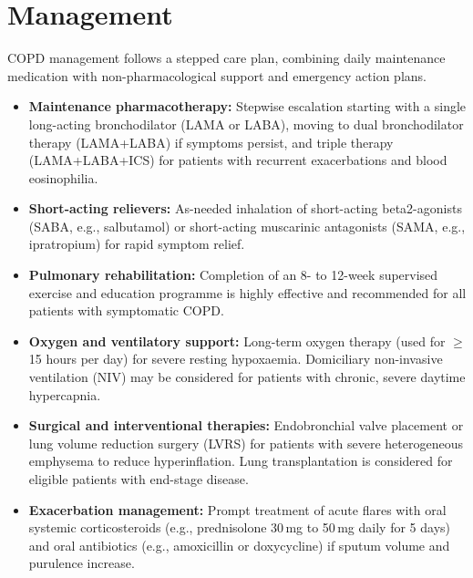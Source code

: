 \section*{Management}
COPD management follows a stepped care plan, combining daily maintenance medication with non-pharmacological support and emergency action plans.
\begin{itemize}
    \item \textbf{Maintenance pharmacotherapy:} Stepwise escalation starting with a single long-acting bronchodilator (LAMA or LABA), moving to dual bronchodilator therapy (LAMA+LABA) if symptoms persist, and triple therapy (LAMA+LABA+ICS) for patients with recurrent exacerbations and blood eosinophilia.
    \item \textbf{Short-acting relievers:} As-needed inhalation of short-acting beta2-agonists (SABA, e.g., salbutamol) or short-acting muscarinic antagonists (SAMA, e.g., ipratropium) for rapid symptom relief.
    \item \textbf{Pulmonary rehabilitation:} Completion of an 8- to 12-week supervised exercise and education programme is highly effective and recommended for all patients with symptomatic COPD.
    \item \textbf{Oxygen and ventilatory support:} Long-term oxygen therapy (used for $\ge$ 15 hours per day) for severe resting hypoxaemia. Domiciliary non-invasive ventilation (NIV) may be considered for patients with chronic, severe daytime hypercapnia.
    \item \textbf{Surgical and interventional therapies:} Endobronchial valve placement or lung volume reduction surgery (LVRS) for patients with severe heterogeneous emphysema to reduce hyperinflation. Lung transplantation is considered for eligible patients with end-stage disease.
    \item \textbf{Exacerbation management:} Prompt treatment of acute flares with oral systemic corticosteroids (e.g., prednisolone 30\,mg to 50\,mg daily for 5 days) and oral antibiotics (e.g., amoxicillin or doxycycline) if sputum volume and purulence increase.
\end{itemize}

